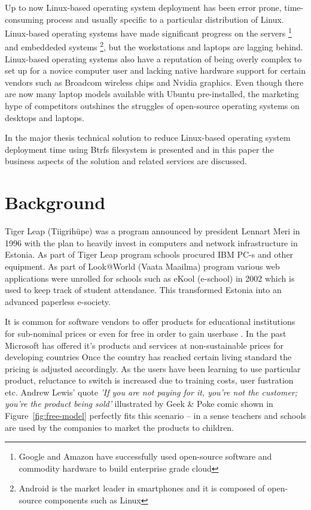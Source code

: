 \documentclass{article}
\begin{document}
Up to now Linux-based operating system deployment has been
error prone, time-consuming process and usually specific to
a particular distribution of Linux.
Linux-based operating systems have made significant
progress on the servers
\footnote{Google and Amazon have successfully used open-source software
and commodity hardware to build enterprise grade cloud}
and embeddeded systems
\footnote{Android is the market leader in smartphones and it is composed of open-source components such as Linux}, but
the workstations and laptops are lagging behind.
Linux-based operating systems also have a reputation
of being overly complex to set up for a novice computer user and
lacking native hardware support for certain vendors such
as Broadcom \cite{new-linux-broadcom-wi-fi-drivers-arrive} wireless chips and Nvidia
\cite{nvidia-seeks-peace-with-linux-pledges-help-on-open-source-driver}
graphics.
Even though there are now many laptop models available with
Ubuntu pre-installed, the marketing hype of
competitors outshines the struggles of open-source
operating systems on desktops and laptops.

In the major thesis technical solution to reduce
Linux-based operating system deployment time using
Btrfs filesystem is presented and in this paper the business aspects
of the solution and related services are discussed.


\section{Background}

Tiger Leap (Tiigrihüpe) was a program announced
by president Lennart Meri in 1996 with the plan to heavily invest
in computers and network infrastructure in Estonia.
As part of Tiger Leap program schools procured IBM PC-s and
other equipment.
As part of Look@World (Vaata Maailma) program
various web applications were unrolled for schools such as
eKool (e-school) in 2002 which is used to keep track of student attendance.
This transformed Estonia into an advanced paperless e-society.

It is common for software vendors to offer products for
educational institutions for sub-nominal prices or even for free
in order to gain userbase \cite{dreamspark} \cite{google-for-education}
\cite{apple-education-pricing}.
In the past Microsoft has offered it's products and
services at non-sustainable prices
for developing countries \cite{microsoft-giveaway}
Once the country has reached certain living standard the
pricing is adjusted accordingly.
As the users have been learning to use particular product,
reluctance to switch is increased due to training costs,
user fustration etc.
Andrew Lewis' quote \emph{'If you are not paying for it,
you're not the customer; you're the product being sold'}
\cite{user-driven-discontent}
illustrated by Geek \& Poke comic shown in
Figure~\ref{fig:free-model}
perfectly fits this scenario --
in a sense  teachers and schools are used by the companies
to market the products to children.
\end{document}
